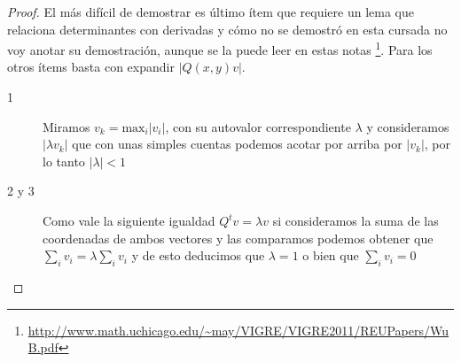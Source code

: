 \documentclass[11pt]{article}
\theoremstyle{plain} %
\theoremstyle{definition}
\theoremstyle{remark}
\begin{document}
\begin{proof}
	El más difícil de demostrar es último ítem que requiere un lema que relaciona determinantes con derivadas y cómo no se demostró en esta cursada no voy anotar su demostración, aunque se la puede leer en estas notas \footnote{\url{http://www.math.uchicago.edu/~may/VIGRE/VIGRE2011/REUPapers/WuB.pdf}}.
	Para los otros ítems basta con expandir $|Q(x,y)v|$. 
	\begin{description}
		\item[1]
		Miramos $v_k = \text{max}_{i} |v_i|$, con su autovalor correspondiente $\lambda$ y consideramos $|\lambda v_k|$ que con unas simples cuentas podemos acotar por arriba por $|v_k|$, por lo tanto $|\lambda| < 1$
		
		\item[2 y 3] 
		Como vale la siguiente igualdad $Q^{t}v = \lambda v$ si consideramos la suma de las coordenadas de ambos vectores y las comparamos podemos obtener que $\sum_{i} v_i = \lambda \sum_{i} v_i$ y de esto deducimos que $\lambda = 1$ o bien que $\sum_{i} v_i = 0$
	\end{description}
\end{proof}
\end{document}
